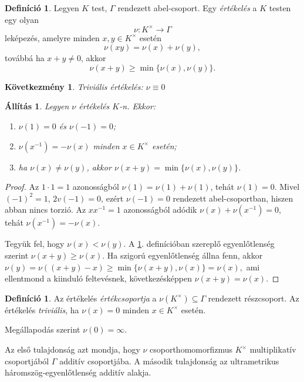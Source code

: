 \documentclass[11pt,a4paper]{article}
\newtheorem{allitas}[tetel]{Állítás}
\newtheorem{kovetkezmeny}[tetel]{Következmény}
\theoremstyle{definition}
\newtheorem{definicio}[tetel]{Definíció}
\begin{document}
\begin{definicio}
\label{def:ertekeles}
Legyen $K$ test, $\Gamma$ rendezett abel-csoport. Egy
\emph{értékelés} a $K$ testen egy olyan
\[
  \nu:K^\times\longrightarrow \Gamma
\]
leképezés, amelyre minden $x,y\in K^\times$ esetén
\[
  \nu(xy)=\nu(x)+\nu(y),
\]
továbbá ha $x+y\neq 0$, akkor
\[
  \nu(x+y)\geq \min\{\nu(x),\nu(y)\}.
\]
\begin{kovetkezmeny}
   Triviális értékelés: $\nu \equiv0 $
\end{kovetkezmeny}
\begin{allitas}

Legyen $\nu$ értékelés $K$-n. Ekkor:
\begin{enumerate}
  \item $\nu(1)=0$ és $\nu(-1)=0$;
  \item $\nu(x^{-1})=-\nu(x)$ minden $x\in K^\times$ esetén;
  \item ha $\nu(x)\neq \nu(y)$, akkor $\nu(x+y)=\min\{\nu(x),\nu(y)\}$.
\end{enumerate}
\end{allitas}

\begin{proof}
Az $1\cdot 1=1$ azonosságból
$
\nu(1)=
\nu(1)+
\nu(1)$, tehát $
\nu(1)=0$. Mivel $(-1)^2=1$,
$2v(-1)=0$, ezért $
\nu(-1)=0$ rendezett abel-csoportban, hiszen abban
nincs torzió. Az $xx^{-1}=1$ azonosságból adódik
$
\nu(x)+
\nu(x^{-1})=0$, tehát $
\nu(x^{-1})=-
\nu(x)$.

Tegyük fel, hogy $
\nu(x)<
\nu(y)$. A \ref{def:ertekeles}. definícióban
szereplő egyenlőtlenség szerint $
\nu(x+y)\geq 
\nu(x)$. Ha szigorú
egyenlőtlenség állna fenn, akkor
$
\nu(y)=
\nu((x+y)-x)\geq \min\{
\nu(x+y),
\nu(x)\}=
\nu(x),
$
ami ellentmond a kiinduló feltevésnek, következésképpen
$
\nu(x+y)=
\nu(x)$.
\end{proof}

\begin{definicio}
Az értékelés \emph{értékcsoportja} a $
\nu(K^\times)\subseteq\Gamma$
rendezett részcsoport. Az értékelés \emph{triviális}, ha
$
\nu(x)=0$ minden $x\in K^\times$ esetén.
\end{definicio}
Megállapodás szerint $
\nu(0)=\infty$.
\end{definicio}

Az első tulajdonság azt mondja, hogy $
\nu$ csoporthomomorfizmus
$K^\times$ multiplikatív csoportjából $\Gamma$ additív csoportjába. A
második tulajdonság az ultrametrikus háromszög-egyenlőtlenség
additív alakja.
\end{document}
